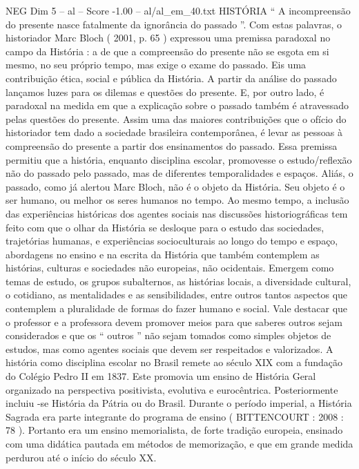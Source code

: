 \begin{textsample}{NEG Dim 5 – al – Score -1.00 – al/al\_em\_40.txt}  \label{ex:f5_neg_246}
HISTÓRIA “ A incompreensão do presente nasce fatalmente da ignorância do passado ”.
Com estas palavras, o historiador Marc Bloch ( 2001, p. 65 ) expressou uma premissa paradoxal no campo da História : a de que a compreensão do presente não se esgota em si mesmo, no seu próprio tempo, mas exige o exame do passado.
Eis uma contribuição ética, social e pública da História.
A partir da análise do passado lançamos luzes para os dilemas e questões do presente.
E, por outro lado, é paradoxal na medida em que a explicação sobre o passado também é atravessado pelas questões do presente.
Assim uma das maiores contribuições que o ofício do historiador tem dado a sociedade brasileira contemporânea, é levar as pessoas à compreensão do presente a partir dos ensinamentos do passado.
Essa premissa permitiu que a história, enquanto disciplina escolar, promovesse o estudo/reflexão não do passado pelo passado, mas de diferentes temporalidades e espaços.
Aliás, o passado, como já alertou Marc Bloch, não é o objeto da História.
Seu objeto é o ser humano, ou melhor os seres humanos no tempo.
Ao mesmo tempo, a inclusão das experiências históricas dos agentes sociais nas discussões historiográficas tem feito com que o olhar da História se desloque para o estudo das sociedades, trajetórias humanas, e experiências socioculturais ao longo do tempo e espaço, abordagens no ensino e na escrita da História que também contemplem as histórias, culturas e sociedades não europeias, não ocidentais.
Emergem como temas de estudo, os grupos subalternos, as histórias locais, a diversidade cultural, o cotidiano, as mentalidades e as sensibilidades, entre outros tantos aspectos que contemplem a pluralidade de formas do fazer humano e social.
Vale destacar que o professor e a professora devem promover meios para que saberes outros sejam considerados e que os “ outros ” não sejam tomados como simples objetos de estudos, mas como agentes sociais que devem ser respeitados e valorizados.
A história como disciplina escolar no Brasil remete ao século XIX com a fundação do Colégio Pedro II em 1837.
Este promovia um ensino de História Geral organizado na perspectiva positivista, evolutiva e eurocêntrica.
Posteriormente incluiu -se História da Pátria ou do Brasil.
Durante o período imperial, a História Sagrada era parte integrante do programa de ensino ( BITTENCOURT : 2008 : 78 ).
Portanto era um ensino memorialista, de forte tradição europeia, ensinado com uma didática pautada em métodos de memorização, e que em grande medida perdurou até o início do século XX.

\end{textsample}
